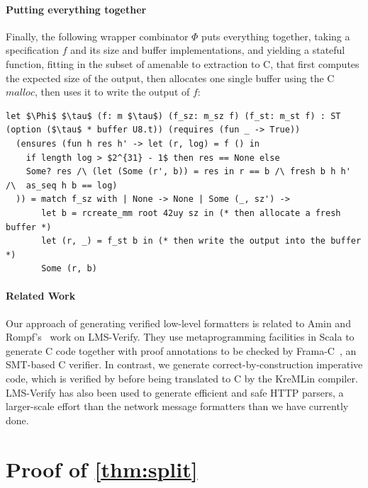 \paragraph{\bf Putting everything together}
Finally, the following wrapper combinator $\Phi$ puts everything
together, taking a specification $f$ and its size and buffer
implementations, and yielding a stateful function, fitting in
the \lowstar subset of \fstar amenable to extraction to C, that first
computes the expected size of the output, then allocates one single
buffer using the C \ls$malloc$, then uses it to write the output of
$f$:
\begin{lstlisting}
let $\Phi$ $\tau$ (f: m $\tau$) (f_sz: m_sz f) (f_st: m_st f) : ST (option ($\tau$ * buffer U8.t)) (requires (fun _ -> True))
  (ensures (fun h res h' -> let (r, log) = f () in
    if length log > $2^{31} - 1$ then res == None else
    Some? res /\ (let (Some (r', b)) = res in r == b /\ fresh b h h' /\  as_seq h b == log)
  )) = match f_sz with | None -> None | Some (_, sz') ->
       let b = rcreate_mm root 42uy sz in (* then allocate a fresh buffer *)
       let (r, _) = f_st b in (* then write the output into the buffer *)
       Some (r, b)
\end{lstlisting}

\paragraph{\bf Related Work}
Our approach of generating verified low-level formatters is related to
Amin and Rompf's~\cite{Amin:2017:LAW:3009837.3009867} work on
LMS-Verify. They use metaprogramming facilities in Scala to generate C
code together with proof annotations to be checked by
Frama-C~\citep{CuoqKKPSY12}, an SMT-based C verifier. In contrast, we
generate correct-by-construction imperative \lowstar code, which is
verified by \fstar{} before being translated to C by the KreMLin
compiler.  LMS-Verify has also been used to generate efficient and
safe HTTP parsers, a larger-scale effort than the network message
formatters than we have currently done.


\newpage

\section{Proof of \autoref{thm:split}}
\label{app:correctness}


